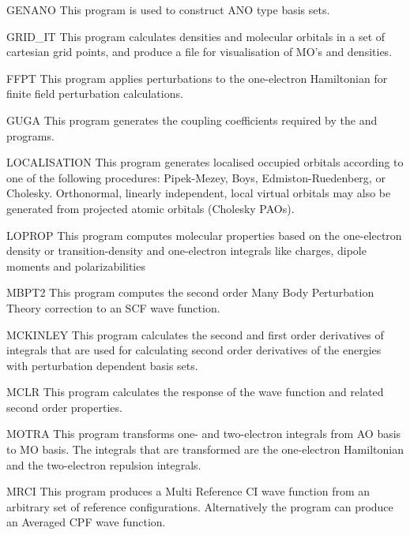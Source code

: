 \begin{programlist}
\item[GENANO]
This program is used to construct ANO type basis sets.

\item[GRID\_IT]
This program calculates densities and molecular orbitals
in a set of cartesian grid points, and produce a file for
visualisation of MO's and densities.
\item[FFPT]
This program applies perturbations to the one-{}electron Hamiltonian
for finite field perturbation calculations.
\item[GUGA]
This program generates the coupling coefficients required by the
 and
 programs.
\item[LOCALISATION]
This program generates localised occupied orbitals according to one of
 the following procedures: Pipek-Mezey, Boys,
 Edmiston-Ruedenberg, or Cholesky. Orthonormal, linearly
 independent, local virtual orbitals may also be generated
 from projected atomic orbitals (Cholesky PAOs).
\item[LOPROP]
 This program computes molecular properties based on the
 one-electron density or transition-density and
 one-electron integrals like charges, dipole moments and
 polarizabilities
\item[MBPT2]
This program computes the second order Many Body Perturbation Theory
correction to an SCF wave function.
\item[MCKINLEY]
This program calculates the second and first order derivatives of
integrals that are used
for calculating second order derivatives of the energies with perturbation
dependent basis sets.
\item[MCLR]
This program calculates the response of the wave function
and related second order properties.
\item[MOTRA]
This program transforms one- and two-electron integrals from AO
basis to MO basis. The integrals that are transformed are the
one-electron Hamiltonian and the two-electron repulsion integrals.
\item[MRCI]
This program produces a Multi Reference CI wave function from an
arbitrary set of reference configurations. Alternatively the program
can produce an Averaged CPF wave function.

\end{programlist}
